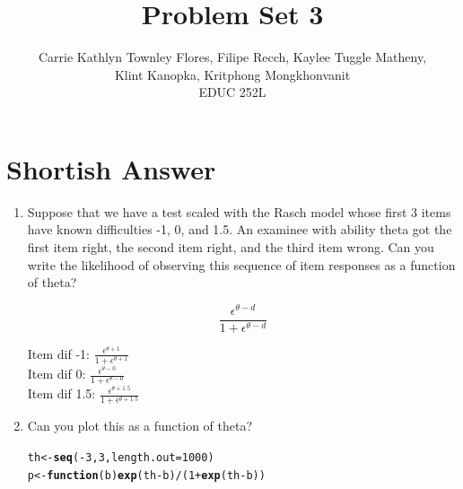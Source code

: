 \documentclass{article}\usepackage[]{graphicx}\usepackage[]{color}
\title{Problem Set 3}
\author{Carrie Kathlyn Townley Flores, Filipe Recch, Kaylee Tuggle Matheny, \\ Klint Kanopka, Kritphong Mongkhonvanit \\ EDUC 252L}
\makeatletter
\newcommand{\hlnum}[1]{\textcolor[rgb]{0.686,0.059,0.569}{#1}}%
\newcommand{\hlopt}[1]{\textcolor[rgb]{0,0,0}{#1}}%
\newcommand{\hlstd}[1]{\textcolor[rgb]{0.345,0.345,0.345}{#1}}%
\newcommand{\hlkwa}[1]{\textcolor[rgb]{0.161,0.373,0.58}{\textbf{#1}}}%
\newcommand{\hlkwb}[1]{\textcolor[rgb]{0.69,0.353,0.396}{#1}}%
\newcommand{\hlkwc}[1]{\textcolor[rgb]{0.333,0.667,0.333}{#1}}%
\newcommand{\hlkwd}[1]{\textcolor[rgb]{0.737,0.353,0.396}{\textbf{#1}}}%
\newenvironment{kframe}{%
 \def\at@end@of@kframe{}%
 \ifinner\ifhmode%
  \def\at@end@of@kframe{\end{minipage}}%
  \begin{minipage}{\columnwidth}%
 \fi\fi%
 \def\FrameCommand##1{\hskip\@totalleftmargin \hskip-\fboxsep
 \colorbox{shadecolor}{##1}\hskip-\fboxsep
     \hskip-\linewidth \hskip-\@totalleftmargin \hskip\columnwidth}%
 \MakeFramed {\advance\hsize-\width
   \@totalleftmargin\z@ \linewidth\hsize
   \@setminipage}}%
 {\par\unskip\endMakeFramed%
 \at@end@of@kframe}
\newenvironment{knitrout}{}{} %
\makeatother
\begin{document}
\maketitle

\section*{Shortish Answer}
\begin{enumerate}

\item Suppose that we have a test scaled with the Rasch model whose first 3 items have known difficulties -1, 0, and 1.5. An examinee with ability theta got the first item right, the second item right, and the third item wrong. Can you write the likelihood of observing this sequence of item responses as a function of theta?

$$ \frac{\epsilon^{\theta - d}}{1+\epsilon^{\theta - d}} $$ 

Item dif -1: $ \frac{\epsilon^{\theta + 1}}{1+\epsilon^{\theta + 1}} $ \\
Item dif 0: $ \frac{\epsilon^{\theta - 0}}{1+\epsilon^{\theta - 0}} $ \\
Item dif 1.5: $ \frac{\epsilon^{\theta + 1.5}}{1+\epsilon^{\theta + 1.5}} $ 

\item Can you plot this as a function of theta?

\begin{knitrout}
\color{fgcolor}\begin{kframe}
\begin{alltt}
\hlstd{th}\hlkwb{<-}\hlkwd{seq}\hlstd{(}\hlopt{-}\hlnum{3}\hlstd{,}\hlnum{3}\hlstd{,}\hlkwc{length.out}\hlstd{=}\hlnum{1000}\hlstd{)}
\hlstd{p}\hlkwb{<-}\hlkwa{function}\hlstd{(}\hlkwc{b}\hlstd{)} \hlkwd{exp}\hlstd{(th}\hlopt{-}\hlstd{b)}\hlopt{/}\hlstd{(}\hlnum{1}\hlopt{+}\hlkwd{exp}\hlstd{(th}\hlopt{-}\hlstd{b))}


\end{alltt}
\end{kframe}
\end{knitrout}
\end{enumerate}
\end{document}

